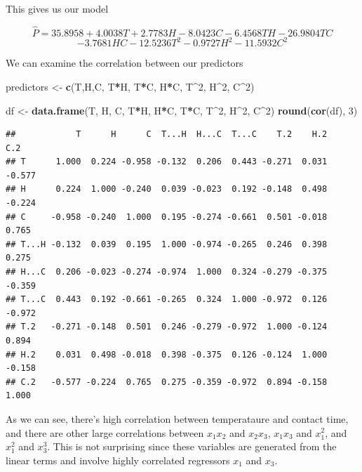 \documentclass[
  11pt,
]{article}
\newenvironment{Shaded}{\begin{snugshade}}{\end{snugshade}}
\newcommand{\DecValTok}[1]{\textcolor[rgb]{0.00,0.00,0.81}{#1}}
\newcommand{\FunctionTok}[1]{\textcolor[rgb]{0.13,0.29,0.53}{\textbf{#1}}}
\newcommand{\NormalTok}[1]{#1}
\newcommand{\OtherTok}[1]{\textcolor[rgb]{0.56,0.35,0.01}{#1}}
\newcommand{\SpecialCharTok}[1]{\textcolor[rgb]{0.81,0.36,0.00}{\textbf{#1}}}
\begin{document}
This gives us our model

\[\hat{P} = 35.8958 + 4.0038T + 2.7783 H -8.0423C -6.4568TH -26.9804TC\]
\[-3.7681HC -12.5236T^2 -0.9727H^2-11.5932C^2\]

We can examine the correlation between our predictors

\begin{Shaded}
\begin{Highlighting}[]
\NormalTok{predictors }\OtherTok{\textless{}{-}} \FunctionTok{c}\NormalTok{(T,H,C, T}\SpecialCharTok{*}\NormalTok{H, T}\SpecialCharTok{*}\NormalTok{C, H}\SpecialCharTok{*}\NormalTok{C, T}\SpecialCharTok{\^{}}\DecValTok{2}\NormalTok{, H}\SpecialCharTok{\^{}}\DecValTok{2}\NormalTok{, C}\SpecialCharTok{\^{}}\DecValTok{2}\NormalTok{)}

\NormalTok{df }\OtherTok{\textless{}{-}} \FunctionTok{data.frame}\NormalTok{(T, H, C, T}\SpecialCharTok{*}\NormalTok{H, H}\SpecialCharTok{*}\NormalTok{C, T}\SpecialCharTok{*}\NormalTok{C, T}\SpecialCharTok{\^{}}\DecValTok{2}\NormalTok{, H}\SpecialCharTok{\^{}}\DecValTok{2}\NormalTok{, C}\SpecialCharTok{\^{}}\DecValTok{2}\NormalTok{)}
\FunctionTok{round}\NormalTok{(}\FunctionTok{cor}\NormalTok{(df), }\DecValTok{3}\NormalTok{)}
\end{Highlighting}
\end{Shaded}

\begin{verbatim}
##            T      H      C  T...H  H...C  T...C    T.2    H.2    C.2
## T      1.000  0.224 -0.958 -0.132  0.206  0.443 -0.271  0.031 -0.577
## H      0.224  1.000 -0.240  0.039 -0.023  0.192 -0.148  0.498 -0.224
## C     -0.958 -0.240  1.000  0.195 -0.274 -0.661  0.501 -0.018  0.765
## T...H -0.132  0.039  0.195  1.000 -0.974 -0.265  0.246  0.398  0.275
## H...C  0.206 -0.023 -0.274 -0.974  1.000  0.324 -0.279 -0.375 -0.359
## T...C  0.443  0.192 -0.661 -0.265  0.324  1.000 -0.972  0.126 -0.972
## T.2   -0.271 -0.148  0.501  0.246 -0.279 -0.972  1.000 -0.124  0.894
## H.2    0.031  0.498 -0.018  0.398 -0.375  0.126 -0.124  1.000 -0.158
## C.2   -0.577 -0.224  0.765  0.275 -0.359 -0.972  0.894 -0.158  1.000
\end{verbatim}

As we can see, there's high correlation between temperataure and contact
time, and there are other large correlations between \(x_1x_2\) and
\(x_2x_3\), \(x_1x_3\) and \(x_1^2\), and \(x_1^2\) and \(x_3^3\). This
is not surprising since these variables are generated from the linear
terms and involve highly correlated regressors \(x_1\) and \(x_3\).
\end{document}
